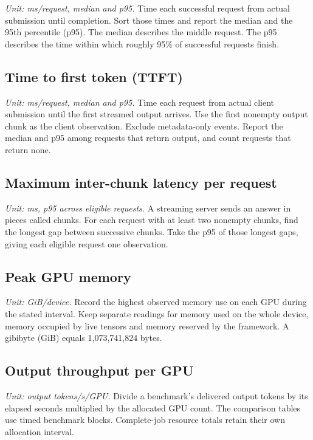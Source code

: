 \textit{Unit: ms/request, median and p95.} Time each successful request from actual submission until completion. Sort those times and report the median and the 95th percentile (p95). The median describes the middle request. The p95 describes the time within which roughly 95\% of successful requests finish.

\subsection{Time to first token (TTFT)}

\textit{Unit: ms/request, median and p95.} Time each request from actual client submission until the first streamed output arrives. Use the first nonempty output chunk as the client observation. Exclude metadata-only events. Report the median and p95 among requests that return output, and count requests that return none.

\subsection{Maximum inter-chunk latency per request}

\textit{Unit: ms, p95 across eligible requests.} A streaming server sends an answer in pieces called chunks. For each request with at least two nonempty chunks, find the longest gap between successive chunks. Take the p95 of those longest gaps, giving each eligible request one observation.

\subsection{Peak GPU memory}

\textit{Unit: GiB/device.} Record the highest observed memory use on each GPU during the stated interval. Keep separate readings for memory used on the whole device, memory occupied by live tensors and memory reserved by the framework. A gibibyte (GiB) equals 1,073,741,824 bytes.

\subsection{Output throughput per GPU}

\textit{Unit: output tokens/s/GPU.} Divide a benchmark's delivered output tokens by its elapsed seconds multiplied by the allocated GPU count. The comparison tables use timed benchmark blocks. Complete-job resource totals retain their own allocation interval.

